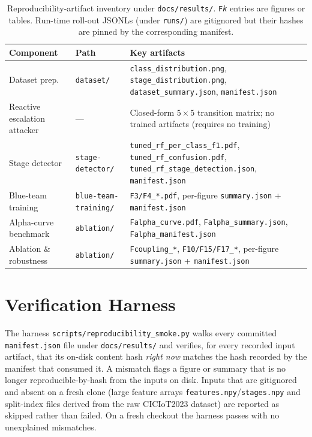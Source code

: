 \begin{table}[!htbp]
\centering
\caption[Reproducibility-artifact inventory.]{Reproducibility-artifact inventory under \texttt{docs/results/}. \texttt{F\textit{k}} entries are figures or tables. Run-time roll-out JSONLs (under \texttt{runs/}) are gitignored but their hashes are pinned by the corresponding manifest.}
\label{tab:manifest_inventory}
\scriptsize
\begin{tabularx}{\textwidth}{l l X}
\toprule
Component & Path & Key artifacts \\
\midrule
Dataset prep. & \texttt{dataset/} & \texttt{class\_distribution.png}, \texttt{stage\_distribution.png}, \texttt{dataset\_summary.json}, \texttt{manifest.json} \\
Reactive escalation attacker & --- & Closed-form $5\times5$ transition matrix; no trained artifacts (requires no training) \\
Stage detector & \texttt{stage-detector/} & \texttt{tuned\_rf\_per\_class\_f1.pdf}, \texttt{tuned\_rf\_confusion.pdf}, \texttt{tuned\_rf\_stage\_detection.json}, \texttt{manifest.json} \\
Blue-team training & \texttt{blue-team-training/} & \texttt{F3/F4\_*.pdf}, per-figure \texttt{summary.json} + \texttt{manifest.json} \\
Alpha-curve benchmark & \texttt{ablation/} & \texttt{Falpha\_curve.pdf}, \texttt{Falpha\_summary.json}, \texttt{Falpha\_manifest.json} \\
Ablation \& robustness & \texttt{ablation/} & \texttt{Fcoupling\_*}, \texttt{F10/F15/F17\_*}, per-figure \texttt{summary.json} + \texttt{manifest.json} \\
\bottomrule
\end{tabularx}
\end{table}

\section{Verification Harness}\label{app:r1}
The harness \texttt{scripts/reproducibility\_smoke.py} walks every committed \texttt{manifest.json} file under \texttt{docs/results/} and verifies, for every recorded input artifact, that its on-disk content hash \emph{right now} matches the hash recorded by the manifest that consumed it. A mismatch flags a figure or summary that is no longer reproducible-by-hash from the inputs on disk. Inputs that are gitignored and absent on a fresh clone (large feature arrays \texttt{features.npy}/\texttt{stages.npy} and split-index files derived from the raw CICIoT2023 dataset) are reported as skipped rather than failed. On a fresh checkout the harness passes with no unexplained mismatches.

